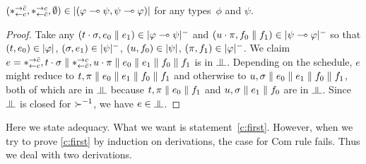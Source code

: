 \begin{proposition}
 \label{comod-type}
 $(\ast^{\rightarrow {\bar{c}}}_{\leftarrow{c}},\ast^{\rightarrow {c}}_{\leftarrow{\bar{c}}},\emptyset)\in|{(\varphi\multimap\psi,\psi\multimap\varphi)}|$
 for any types~$\phi$ and $\psi$.
\end{proposition}
\begin{proof}
 Take any $(t\cdot\sigma,e_{0}\parallel e_{1})\in|{\varphi\multimap\psi}|^-$
 and $(u\cdot\pi,f_{0}\parallel f_{1})\in|{\psi\multimap\varphi}|^-$ so that
 $(t, e_{0})\in|{\varphi}|$, $(\sigma,e_{1})\in|{\psi}|^-$,
 $(u, f_{0})\in|{\psi}|$, $(\pi,f_{1})\in|{\varphi}|^-$.
 We claim $e=\ast^{\rightarrow {\bar{c}}}_{\leftarrow{c}},t\cdot\sigma\parallel\ast^{\rightarrow {c}}_{\leftarrow{\bar{c}}},u\cdot\pi\parallel
 e_{0}\parallel e_{1}\parallel f_{0}\parallel f_{1}$ is in
 $\bbot$.
 Depending on the schedule, $e$ might reduce to
 $ t,\pi\parallel e_{0}\parallel e_{1}\parallel f_{0}\parallel f_{1}$ and otherwise to
 $ u,\sigma\parallel e_{0}\parallel e_{1}\parallel f_{0}\parallel f_{1}$,
 both of which are in $\bbot$ because
 $t,\pi\parallel e_{0}\parallel f_{1}$ and
 $u,\sigma\parallel e_{1}\parallel f_{0}$ are in $\bbot$.
 Since $\bbot$ is closed for $\succ^{-1}$,
 we have $e\in\bbot$.
\end{proof}


Here we state adequacy.  What we want is statement~\ref{c:first}.
However, when we try to prove \ref{c:first} by induction on derivations,
the case for Com rule fails.  Thus we deal with two derivations.

